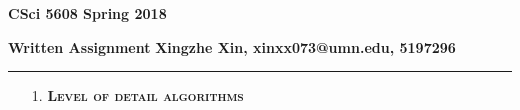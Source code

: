 \documentclass[12pt]{article}
\begin{document}
    \begin{center}
        {\Large \bf CSci 5608 Spring 2018}
    \end{center}
\medskip

{\bf Written Assignment}
\hfill
{\bf Xingzhe Xin, xinxx073@umn.edu, 5197296}
\hrule
\medskip

\begin{enumerate}
    \item[1.]  {\bfseries {\scshape  Level of detail algorithms}}
\end{enumerate}
\end{document}
